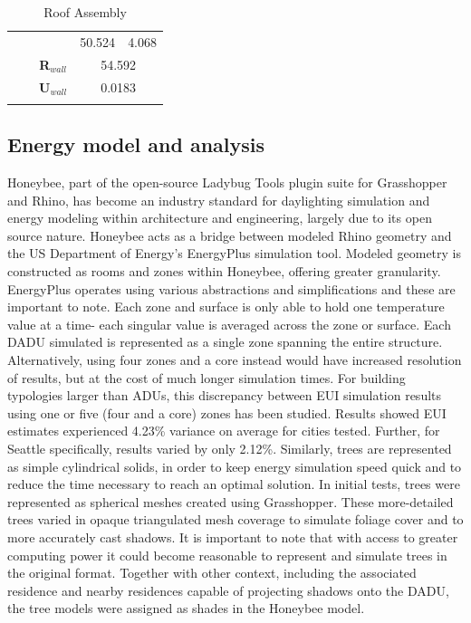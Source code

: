 \documentclass[sagev,times,Review,doublespace]{sagej}
\begin{document}
\begin{table}[h!]
{\begin{tabular}{@{}lcccc@{}}
 &
  \multicolumn{1}{l}{} &
  \multicolumn{1}{l}{} &
  50.524 &
  4.068 \\ \cmidrule(l){3-5} 
 &
  \multicolumn{1}{l|}{} &
  \multicolumn{1}{c|}{\textbf{R$_{wall}$}} &
  \multicolumn{2}{c|}{54.592} \\ \cmidrule(l){3-5} 
 &
  \multicolumn{1}{l|}{} &
  \multicolumn{1}{c|}{\textbf{U$_{wall}$}} &
  \multicolumn{2}{c|}{0.0183} \\
 &
  \multicolumn{1}{l}{} &
  \multicolumn{1}{l}{} &
  \multicolumn{1}{l}{} &
  \multicolumn{1}{l}{} \\ \bottomrule
\end{tabular}%
}
\caption{Roof Assembly}
\label{table:roof-assembly}
\end{table}

\subsection{Energy model and analysis}
Honeybee, part of the open-source Ladybug Tools plugin suite for Grasshopper and Rhino, has become an industry standard for daylighting simulation and energy modeling within architecture and engineering, largely due to its open source nature\cite{mackey2018tool}. Honeybee acts as a bridge between modeled Rhino geometry and the US Department of Energy's EnergyPlus simulation tool. Modeled geometry is constructed as rooms and zones within Honeybee, offering greater granularity. EnergyPlus operates using various abstractions and simplifications and these are important to note\cite{EnergyPlusTMVersionDocumentation2021}. Each zone and surface is only able to hold one temperature value at a time- each singular value is averaged across the zone or surface. Each DADU simulated is represented as a single zone spanning the entire structure. Alternatively, using four zones and a core instead would have increased resolution of results, but at the cost of much longer simulation times. For building typologies larger than ADUs, this discrepancy between EUI simulation results using one or five (four and a core) zones has been studied\cite{SingleZoneVs2018}. Results showed EUI estimates experienced 4.23\% variance on average for cities tested. Further, for Seattle specifically, results varied by only 2.12\%.
Similarly, trees are represented as simple cylindrical solids, in order to keep energy simulation speed quick and to reduce the time necessary to reach an optimal solution. In initial tests, trees were represented as spherical meshes created using Grasshopper. These more-detailed trees varied in opaque triangulated mesh coverage to simulate foliage cover and to more accurately cast shadows. It is important to note that with access to greater computing power it could become reasonable to represent and simulate trees in the original format. Together with other context, including the associated residence and nearby residences capable of projecting shadows onto the DADU, the tree models were assigned as shades in the Honeybee model. 
\end{document}
